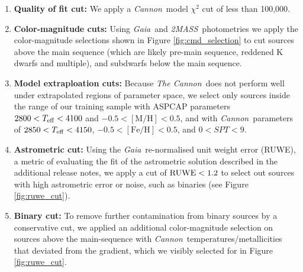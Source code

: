 \documentclass[twocolumn]{aastex62}
\newcommand{\thecannon}{\textsl{The Cannon}}
\newcommand{\cannon}{\textsl{Cannon}}
\newcommand{\gaia}{\textsl{Gaia}}
\newcommand{\zmass}{\textsl{2MASS}}
\newcommand{\feh}{[{\mathrm{Fe}/\mathrm{H}}]}
\newcommand{\mh}{[{\mathrm{M}/\mathrm{H}}]}
\begin{document}
\begin{enumerate}
\item \textbf{Quality of fit cut:} We apply a \cannon\ model $\chi^2$ cut of less than 100,000.

\item \textbf{Color-magnitude cuts:} Using \gaia\ and \zmass\ photometries we apply the color-magnitude selections shown in Figure \ref{fig:cmd_selection} to cut sources above the main sequence (which are likely pre-main sequence, reddened K dwarfs and multiple), and subdwarfs below the main sequence.

\item \textbf{Model extraploation cuts:} Because \thecannon\ does not perform well under extrapolated regions of parameter space, we select only sources inside the range of our training sample with ASPCAP parameters $2800<T_{\rm eff}<4100$ and $-0.5<\mh<0.5$, and with \cannon\ parameters of $2850<T_{\rm eff}<4150$, $-0.5<\feh<0.5$, and $0<SPT<9$.

\item \textbf{Astrometric cut:} Using the \gaia\ re-normalised unit weight error (RUWE), a metric of evaluating the fit of the astrometric solution described in the additional release notes, we apply a cut of ${\rm RUWE}<1.2$ to select out sources with high astrometric error or noise, such as binaries (see Figure \ref{fig:ruwe_cut}).

\item \textbf{Binary cut:} To remove further contamination from binary sources by a conservative cut, we applied an additional color-magnitude selection on sources above the main-sequence with \cannon\ temperatures/metallicities that deviated from the gradient, which we visibly selected for in Figure \ref{fig:ruwe_cut}.

\end{enumerate}
\end{document}
